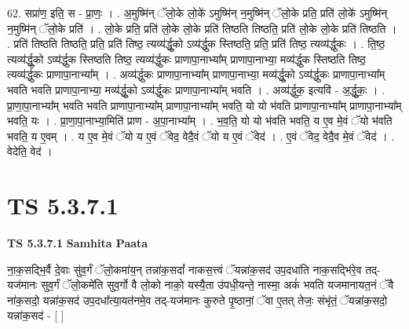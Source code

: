 \documentclass[17pt]{extarticle}
\begin{document}
62. सप्रा॑ण॒ इति॒ स - प्रा॒णः॒ । . अ॒मुष्मि॑न् ॅलो॒के लो॒के॑ ऽमुष्मि॑न् न॒मुष्मि॑न् ॅलो॒के प्रति॒ प्रति॑ लो॒के॑ ऽमुष्मि॑न् न॒मुष्मि॑न् ॅलो॒के प्रति॑ । . लो॒के प्रति॒ प्रति॑ लो॒के लो॒के प्रति॑ तिष्ठति तिष्ठति॒ प्रति॑ लो॒के लो॒के प्रति॑ तिष्ठति । . प्रति॑ तिष्ठति तिष्ठति॒ प्रति॒ प्रति॑ तिष्ठ॒ त्यव्य॑र्द्धु॒को ऽव्य॑र्द्धुक स्तिष्ठति॒ प्रति॒ प्रति॑ तिष्ठ॒ त्यव्य॑र्द्धुकः । . ति॒ष्ठ॒ त्यव्य॑र्द्धु॒को ऽव्य॑र्द्धुक स्तिष्ठति तिष्ठ॒ त्यव्य॑र्द्धुकः प्राणापा॒नाभ्या᳚म् प्राणापा॒नाभ्या॒ मव्य॑र्द्धुक स्तिष्ठति तिष्ठ॒ त्यव्य॑र्द्धुकः प्राणापा॒नाभ्या᳚म् । . अव्य॑र्द्धुकः प्राणापा॒नाभ्या᳚म् प्राणापा॒नाभ्या॒ मव्य॑र्द्धु॒को ऽव्य॑र्द्धुकः प्राणापा॒नाभ्या᳚म् भवति भवति प्राणापा॒नाभ्या॒ मव्य॑र्द्धु॒को ऽव्य॑र्द्धुकः प्राणापा॒नाभ्या᳚म् भवति । . अव्य॑र्द्धुक॒ इत्यवि॑ - अ॒र्द्धु॒कः॒ । . प्रा॒णा॒पा॒नाभ्या᳚म् भवति भवति प्राणापा॒नाभ्या᳚म् प्राणापा॒नाभ्या᳚म् भवति॒ यो यो भ॑वति प्राणापा॒नाभ्या᳚म् प्राणापा॒नाभ्या᳚म् भवति॒ यः । . प्रा॒णा॒पा॒नाभ्या॒मिति॑ प्राण - अ॒पा॒नाभ्या᳚म् । . भ॒व॒ति॒ यो यो भ॑वति भवति॒ य ए॒व मे॒वं ॅयो भ॑वति भवति॒ य ए॒वम् । . य ए॒व मे॒वं ॅयो य ए॒वं ॅवेद॒ वेदै॒वं ॅयो य ए॒वं ॅवेद॑ । . ए॒वं ॅवेद॒ वेदै॒व मे॒वं ॅवेद॑ । . वेदेति॒ वेद॑ । \newline
\pagebreak
{}

\section{ TS 5.3.7.1 }

\textbf{TS 5.3.7.1 } \newline
\textbf{Samhita Paata} \newline

ना॒क॒सद्भि॒र्वै दे॒वाः सु॑व॒र्गं ॅलो॒कमा॑य॒न् तन्ना॑क॒सदां᳚ नाकस॒त्त्वं ॅयन्ना॑क॒सद॑ उप॒दधा॑ति नाक॒सद्भि॑रे॒व तद्-यज॑मानः सुव॒र्गं ॅलो॒कमे॑ति सुव॒र्गो वै लो॒को नाको॒ यस्यै॒ता उ॑पधी॒यन्ते॒ नास्मा॒ अकं॑ भवति यजमानायत॒नं ॅवै ना॑क॒सदो॒ यन्ना॑क॒सद॑ उप॒दधा᳚त्या॒यत॑नमे॒व तद्-यज॑मानः कुरुते पृ॒ष्ठानां॒ ॅवा ए॒तत् तेजः॒ संभृ॑तं॒ ॅयन्ना॑क॒सदो॒ यन्ना॑क॒सद॑ - [  ] \newline
\end{document}
